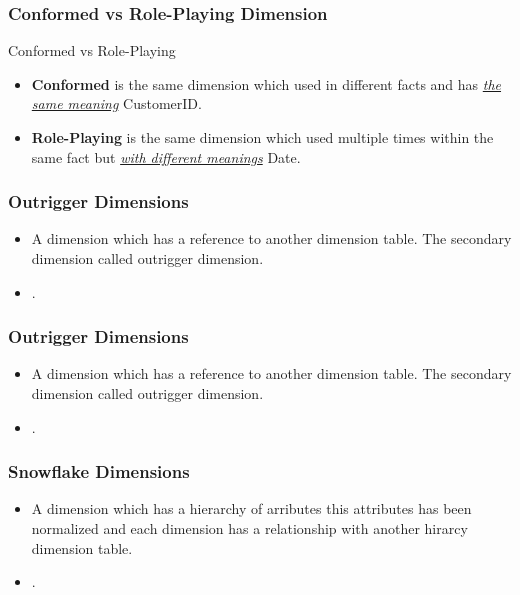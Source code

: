 \begin{frame}
    \frametitle{Conformed vs Role-Playing Dimension}
    \begin{block}{Conformed vs Role-Playing}
        \begin{itemize}
            \item \textbf{Conformed} is the same dimension which used in different facts and has \textit{\underline{the same meaning}} \faEdit \space \faArrowCircleORight \space CustomerID.
            \item \textbf{Role-Playing} is the same dimension which used multiple times within the same fact but \textit{\underline{with different meanings}} \faEdit \space \faArrowCircleORight \space Date.
        \end{itemize}
    \end{block}
\end{frame}
\begin{frame}
    \frametitle{Outrigger Dimensions}
    \begin{itemize}[<+->]
        \item A dimension which has a reference to another dimension table. The secondary dimension called outrigger dimension.
        \item {}.
    \end{itemize}
\end{frame}
\begin{frame}
    \frametitle{Outrigger Dimensions}
    \begin{itemize}
        \item A dimension which has a reference to another dimension table. The secondary dimension called outrigger dimension.\\
        \item {}.
    \end{itemize}
    \centering
    
\end{frame}
\begin{frame}
    \frametitle{Snowflake Dimensions}
    \begin{itemize}[<+->]
        \item A dimension which has a hierarchy of arributes this attributes has been normalized and each dimension has a relationship with another hirarcy dimension table.\\
        \item {}.
    \end{itemize}
\end{frame}
